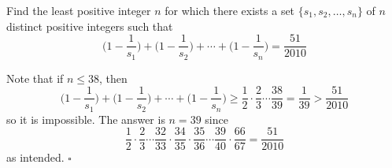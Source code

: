 
\begin{problem}[ISL 2010 N1]
    Find the least positive integer $n$ for which there exists a set $\{s_1, s_2, \ldots, s_n\}$ of $n$ distinct positive integers such that \[\bigg(1-\frac{1}{s_1}\bigg) + \bigg(1-\frac{1}{s_2}\bigg) + \cdots + \bigg(1-\frac{1}{s_n}\bigg) = \frac{51}{2010}\]
\end{problem}

\begin{solution}
    Note that if $n \leq 38$, then \[\bigg(1-\frac{1}{s_1}\bigg) + \bigg(1-\frac{1}{s_2}\bigg) + \cdots + \bigg(1-\frac{1}{s_n}\bigg) \geq \frac12 \cdot \frac23 \cdots \frac{38}{39} = \frac{1}{39} > \frac{51}{2010}\] so it is impossible. The answer is $\boxed{n=39}$ since \[\frac12 \cdot \frac23 \cdots \frac{32}{33} \cdot \frac{34}{35} \cdot \frac{35}{36} \cdots \frac{39}{40} \cdot \frac{66}{67} = \frac{51}{2010}\] as intended. $\square$
\end{solution}
